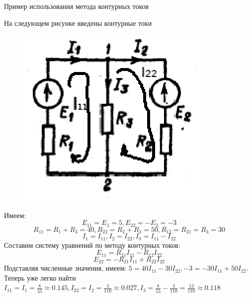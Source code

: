 \documentclass[10pt, pdf, hyperref={unicode},handout]{beamer}
\begin{document}
\begin{frame}{Пример использования метода контурных токов}
  \begin{block}

    \small{
      На следующем рисунке введены контурные токи
\begin{figure}[htb] 
    \centering
    \includegraphics [scale=1.3]{ris19.eps}
  \end{figure}
  Имеем: $$E_{11}=E_1=5, E_{22}=-E_2=-3$$
  $$R_{11}=R_1+R_3=40, R_{22}=R_2+R_3=50, R_{12}=R_{21}=R_3=30$$
  $$I_1=I_{11}, I_2=I_{22},I_3=I_{11}-I_{22}$$
  Составим систему уравнений по методу контурных токов:
  $$E_{11}=R_{11}I_{11}-R_{12}I_{22}$$
  $$E_{22}=-R_{21}I_{11}+R_{22}I_{22}$$
  Подставляя численные значения, имеем: $5=40I_{11}-30I_{22}, -3=-30I_{11}+50I_{22}$. Теперь уже легко найти $I_{11}=I_1=\frac{8}{55}\approx 0.145, I_{22}=I_2=\frac{3}{110}\approx 0.027, I_3=\frac{8}{55}-\frac{3}{110}=\frac{13}{110}\approx 0.118$
      }
  \end{block}
  
\end{frame}
\end{document}
